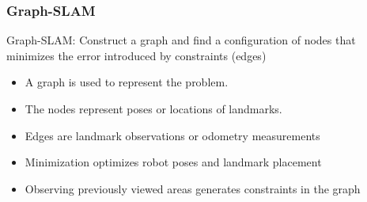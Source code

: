    \begin{frame}
    \frametitle{Graph-SLAM}
    
    Graph-SLAM: Construct a graph and find a configuration of nodes that minimizes the error introduced by constraints (edges)
    
    \begin{itemize}
    \item A graph is used to represent the problem.
    \item The nodes represent poses or locations of landmarks.
    \item Edges are landmark observations or odometry measurements
    \item Minimization optimizes robot poses and landmark placement
    \item Observing previously viewed areas generates constraints in the graph
    \end{itemize}
    
    \begin{figure}
    \hspace{1em}
    \end{figure}
    
    \end{frame}
    
